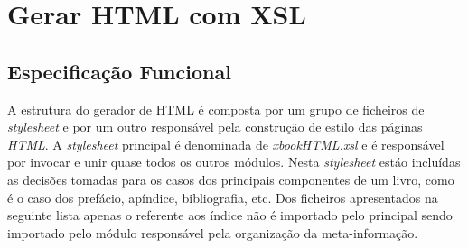 \documentclass[a4paper]{article}
\begin{document}
\newpage

\section{\LARGE Gerar HTML com XSL}

\subsection{\large Especificação Funcional}

\hspace{1cm}A estrutura do gerador de HTML é composta por um grupo de ficheiros de \emph{stylesheet} e por um outro responsável pela construção de estilo das páginas \emph{HTML}. A \emph{stylesheet} principal é denominada de \emph{xbookHTML.xsl} e é responsável por invocar e unir quase todos os outros módulos. Nesta \emph{stylesheet} estáo incluídas
as decisões tomadas para os casos dos principais componentes de um livro, como é o caso dos prefácio, apíndice, bibliografia, etc.
Dos ficheiros apresentados na seguinte lista apenas o referente aos índice não é importado pelo principal sendo importado pelo
módulo responsável pela organização da meta-informação.\\
\end{document}

